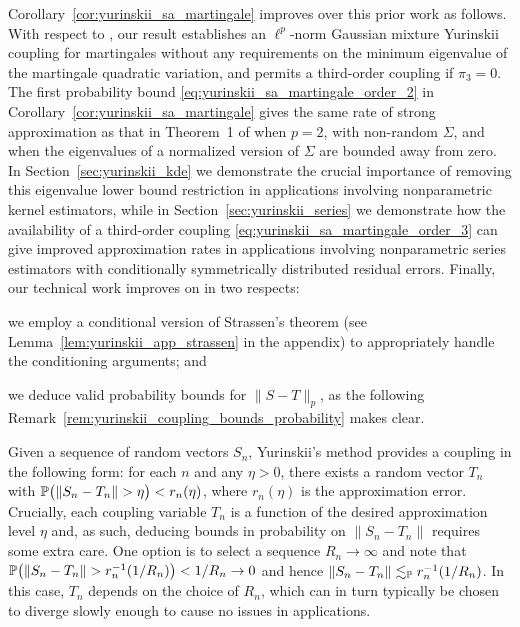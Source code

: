 Corollary~\ref{cor:yurinskii_sa_martingale} improves over this prior work as
follows.
With respect to \citet{li2020uniform}, our result establishes an $\ell^p$-norm
Gaussian mixture Yurinskii coupling for martingales without any requirements on
the minimum eigenvalue of the martingale quadratic variation, and permits a
third-order coupling if $\pi_3=0$. The first probability bound
\eqref{eq:yurinskii_sa_martingale_order_2} in
Corollary~\ref{cor:yurinskii_sa_martingale} gives the
same rate of strong approximation as that in Theorem~1 of \citet{li2020uniform}
when $p=2$, with non-random $\Sigma$, and when the eigenvalues of a normalized
version of $\Sigma$ are bounded away from zero. In
Section~\ref{sec:yurinskii_kde} we
demonstrate the crucial importance of removing this eigenvalue lower bound
restriction in applications involving nonparametric kernel estimators, while in
Section~\ref{sec:yurinskii_series} we demonstrate how the availability of a
third-order
coupling \eqref{eq:yurinskii_sa_martingale_order_3} can give improved
approximation rates
in applications involving nonparametric series estimators with conditionally
symmetrically distributed residual errors. Finally, our technical work improves
on \citet{li2020uniform} in two respects:
%
\begin{inlineroman}
  \item
    we employ a conditional version
    of Strassen's theorem (see Lemma~\ref{lem:yurinskii_app_strassen}
    in the appendix)
    to appropriately handle the conditioning arguments; and
  \item
    we deduce valid
    probability bounds for $\|S-T\|_p$, as the following
    Remark~\ref{rem:yurinskii_coupling_bounds_probability} makes clear.
\end{inlineroman}

\begin{remark}
  \label{rem:yurinskii_coupling_bounds_probability}
  Given a sequence of random vectors $S_n$, Yurinskii's method provides a
  coupling in the following form: for each $n$ and any $\eta > 0$, there exists
  a random vector $T_n$ with $\P\big(\|S_n - T_n\| > \eta\big) < r_n(\eta)$,
  where $r_n(\eta)$ is the approximation error. Crucially, each coupling
  variable $T_n$ is a function of the desired approximation level $\eta$ and,
  as such, deducing bounds in probability on $\|S_n - T_n\|$ requires some
  extra care. One option is to select a sequence $R_n \to \infty$ and note that
  $\P\big(\|S_n - T_n\| > r_n^{-1}(1 / R_n)\big) < 1 / R_n \to 0$ and hence
  $\|S_n - T_n\| \lesssim_\P r_n^{-1}(1 / R_n)$. In this case, $T_n$ depends on
  the choice of $R_n$, which can in turn typically be chosen to diverge slowly
  enough to cause no issues in applications.
\end{remark}


